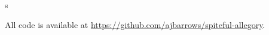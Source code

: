 s

All code is available at \href{https://github.com/ajbarrows/spiteful-allegory}{https://github.com/ajbarrows/spiteful-allegory}.


%
%




